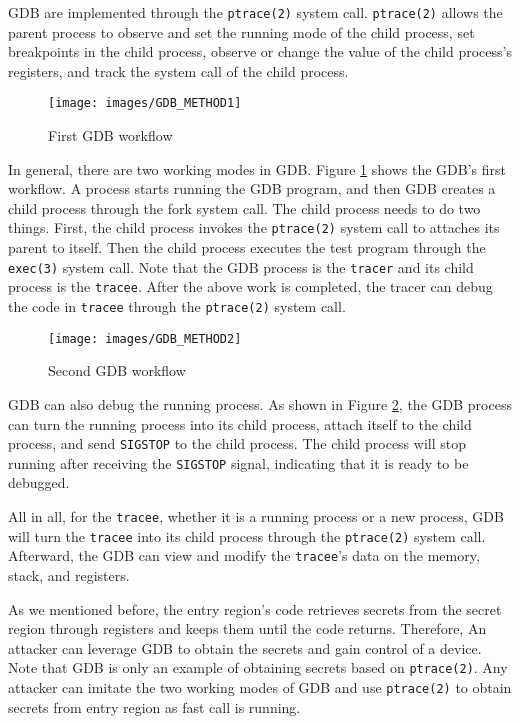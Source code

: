 GDB are implemented through the \verb|ptrace(2)| system call. 
\verb|ptrace(2)| allows the parent process to observe and set the running mode of 
the child process, set breakpoints in the child process, observe or 
change the value of the child process's registers, and track the system 
call of the child process.

\begin{figure}[tbp]
  \centering
  \texttt{[image: images/GDB\_METHOD1]}
  \caption[Short description]{First GDB workflow}
  \label{fig:GDB_METHOD1}
\end{figure}

In general, there are two working modes in GDB. Figure \ref{fig:GDB_METHOD1} shows 
the GDB's first workflow. A process starts running the GDB program, 
and then GDB creates a child process through the fork system call. 
The child process needs to do two things. First, the child process 
invokes the \verb|ptrace(2)| system call to attaches its parent to itself. 
Then the child process executes the test program through the \verb|exec(3)| 
system call. Note that the GDB process is the \verb|tracer| and its child process 
is the \verb|tracee|. After the above work is completed, the tracer can debug the
code in \verb|tracee| through the \verb|ptrace(2)| system call.


\begin{figure}[tbp]
  \centering
  \texttt{[image: images/GDB\_METHOD2]}
  \caption[Short description]{Second GDB workflow}
  \label{fig:GDB_METHOD2}
\end{figure}

GDB can also debug the running process. As shown in Figure \ref{fig:GDB_METHOD2}, 
the GDB process can turn the running process into its child process, 
attach itself to the child process, and send \verb|SIGSTOP| to the child process. 
The child process will stop running after receiving the \verb|SIGSTOP| signal, 
indicating that it is ready to be debugged.

All in all, for the \verb|tracee|, whether it is a running process or 
a new process, GDB will turn the \verb|tracee| into its child process 
through the \verb|ptrace(2)| system call. Afterward, the GDB can view and modify 
the \verb|tracee|'s data on the memory, stack, and registers.

As we mentioned before, the entry region's code retrieves secrets 
from the secret region through registers and keeps them until the code 
returns. Therefore, An attacker can leverage GDB  to obtain the secrets 
and gain control of a device.  Note that GDB is only an example of obtaining 
secrets based on \verb|ptrace(2)|. Any attacker can imitate the two working modes of 
GDB and use \verb|ptrace(2)| to obtain secrets from entry region as fast call is running.

